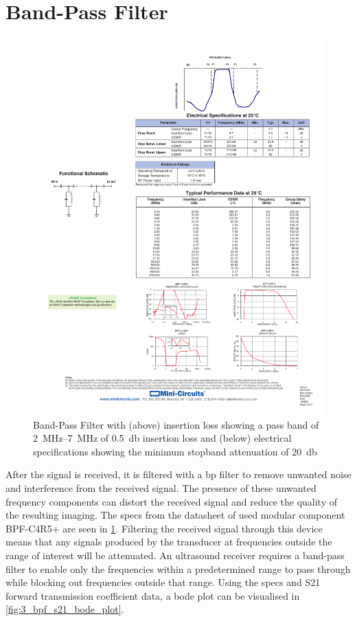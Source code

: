 \section{Band-Pass Filter}
\begin{figure}[htbp]
	\centering
	\includegraphics[width=\textwidth]{Figures/3_bpf_specs.pdf}
	\caption[Band-Pass Filter insertion loss and specifications]{Band-Pass Filter with (above) insertion loss showing a pass band of \qtyrange{2}{7}{\mega\hertz} of \qty{0.5}{\decibel} insertion loss and (below) electrical specifications showing the minimum stopband attenuation of \qty{20}{\decibel} \cite{BPF}}
	\label{fig:3_bpf_specs}
\end{figure}
After the signal is received, it is filtered with a \gls{bp} filter to remove unwanted noise and interference from the received signal. The presence of these unwanted frequency components can distort the received signal and reduce the quality of the resulting imaging. The specs from the datasheet of used modular component BPF-C4R5+ \cite{BPF} are seen in \cref{fig:3_bpf_specs}. Filtering the received signal through this device means that any signals produced by the transducer at frequencies outside the range of interest will be attenuated. An ultrasound receiver requires a band-pass filter to enable only the frequencies within a predetermined range to pass through while blocking out frequencies outside that range. Using the specs and S21 forward transmission coefficient data, a bode plot can be visualised in \cref{fig:3_bpf_s21_bode_plot}.

